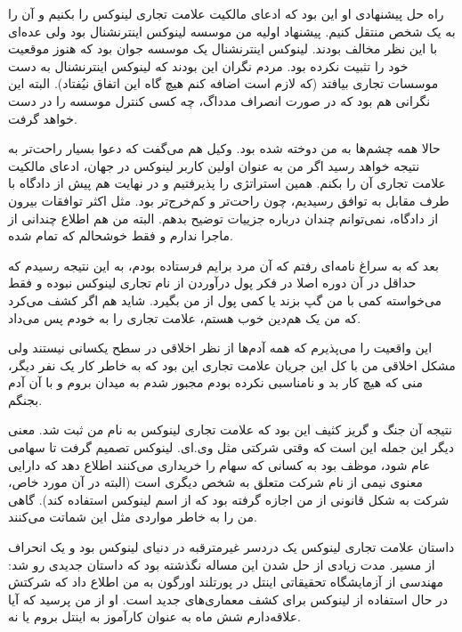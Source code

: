 راه حل پیشنهادی او این بود که ادعای مالکیت علامت تجاری لینوکس را بکنیم
و آن را به یک شخص منتقل کنیم. پیشنهاد اولیه من موسسه لینوکس اینترنشنال
بود ولی عده‌ای با این نظر مخالف بودند. لینوکس اینترنشنال یک موسسه جوان
بود که هنوز موقعیت خود را تثبیت نکرده بود. مردم نگران این بودند که
لینوکس اینترنشنال به دست موسسات تجاری بیافتد (که لازم است اضافه کنم
هیچ گاه این اتفاق نیُفتاد). البته این نگرانی هم بود که در صورت انصراف
مدداگ، چه کسی کنترل موسسه را در دست خواهد گرفت.

حالا همه چشم‌ها به من دوخته شده بود. وکیل هم می‌گفت که دعوا بسیار راحت‌تر
به نتیجه خواهد رسید اگر من به عنوان اولین کاربر لینوکس در جهان، ادعای
مالکیت علامت تجاری آن را بکنم. همین استراتژی را پذیرفتیم و در نهایت هم
پیش از دادگاه با طرف مقابل به توافق رسیدیم، چون راحت‌تر و کم‌خرج‌تر
بود. مثل اکثر توافقات بیرون از دادگاه، نمی‌توانم چندان درباره جزییات
توضیح بدهم. البته من هم اطلاع چندانی از ماجرا ندارم و فقط خوشحالم که
تمام شده.

بعد که به سراغ نامه‌ای رفتم که آن مرد برایم فرستاده بودم، به این نتیجه
رسیدم که حداقل در آن دوره اصلا در فکر پول درآوردن از نام تجاری لینوکس
نبوده و فقط می‌خواسته کمی با من گپ بزند یا کمی پول از من بگیرد. شاید هم
اگر کشف می‌کرد که من یک هم‌دین خوب هستم، علامت تجاری را به خودم پس
می‌داد.

این واقعیت را می‌پذیرم که همه آدم‌ها از نظر اخلاقی در سطح یکسانی نیستند
ولی مشکل اخلاقی من با کل این جریان علامت تجاری این بود که به خاطر کار
یک نفر دیگر،‌ منی که هیچ کار بد و نامناسبی نکرده بودم مجبور شدم به
میدان بروم و با آن آدم بجنگم.

نتیجه آن جنگ و گریز کثیف این بود که علامت تجاری لینوکس به نام من ثبت
شد. معنی دیگر این جمله این است که وقتی شرکتی مثل
وی.ای. لینوکس تصمیم گرفت تا سهامی عام شود، موظف بود به کسانی
که سهام را خریداری می‌کنند اطلاع دهد که دارایی معنوی نیمی از نام شرکت
متعلق به شخص دیگری است (البته در آن مورد خاص، شرکت به شکل قانونی از من
اجازه گرفته بود که از اسم لینوکس استفاده کند). گاهی من را به خاطر
مواردی مثل این شماتت می‌کنند.

داستان علامت تجاری لینوکس یک دردسر غیرمترقبه در دنیای لینوکس بود و یک
انحراف از مسیر. مدت زیادی از حل شدن این مساله نگذشته بود که داستان
جدیدی رو شد: مهندسی از آزمایشگاه تحقیقاتی اینتل در پورتلند اورگون به
من اطلاع داد که شرکتش در حال استفاده از لینوکس برای کشف معماری‌های جدید
است. او از من پرسید که آیا علاقه‌دارم شش ماه به عنوان کارآموز به اینتل
بروم یا نه.

